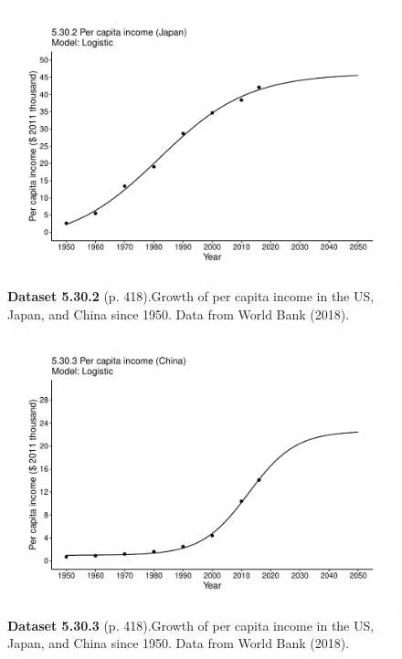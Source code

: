 \documentclass[aps,rmp,preprint,superscriptaddress,10pt,onecolumn]{article}
\begin{document}
\clearpage
\begin{figure}[h]
\includegraphics[width=\textwidth]{output/figs-ggplot/5.30.2.pdf}
\caption*{\textbf{Dataset 5.30.2} (p. 418).Growth of per capita income in the US, Japan, and China since 1950. Data from World Bank (2018).}
\end{figure}
	
\clearpage
\begin{figure}[h]
\includegraphics[width=\textwidth]{output/figs-ggplot/5.30.3.pdf}
\caption*{\textbf{Dataset 5.30.3} (p. 418).Growth of per capita income in the US, Japan, and China since 1950. Data from World Bank (2018).}
\end{figure}
	
\end{document}
